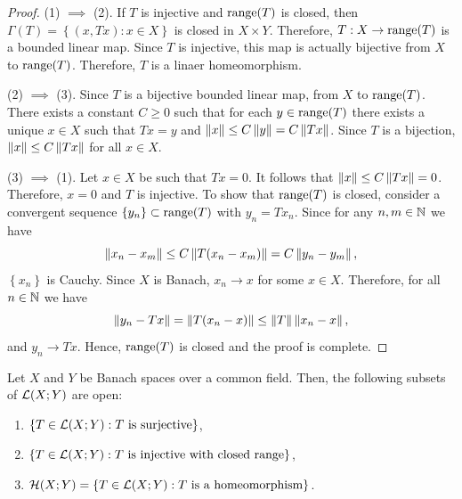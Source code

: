\documentclass[a4paper]{article}
\begin{document}
\begin{proof}
  (1) $\implies$ (2). If $T$ is injective and $\operatorname{range}(T)$ is closed,
  then $\Gamma(T) = \left\{ (x, Tx) : x \in X \right\}$ is closed in
  $X \times Y$. Therefore, $T : X \to \operatorname{range} (T)$ is a bounded linear
  map. Since $T$ is injective, this map is actually bijective from
  $X$ to $\operatorname{range} (T)$. Therefore, $T$ is a linaer homeomorphism.

  (2) $\implies$ (3). Since $T$ is a bijective bounded linear map,
  from $X$ to $\operatorname{range}(T)$. There exists a constant $C \geq 0$
  such that for each $y \in \operatorname{range}(T)$ there exists
  a unique $x \in X$ such that $T x = y$ and $\left\lVert x\right\rVert \leq
  C \left\lVert y\right\rVert = C \left\lVert T x\right\rVert$. Since $T$ is a bijection,
  $\left\lVert x\right\rVert \leq C \left\lVert T x\right\rVert$ for all $x \in X$.

  (3) $\implies$ (1). Let $x \in X$ be such that $T x = 0$.
  It follows that $\left\lVert x\right\rVert \leq C \left\lVert T x\right\rVert = 0$. Therefore,
  $x = 0$ and $T$ is injective. To show that
  $\operatorname{range}(T)$ is closed, consider a convergent sequence
  $\left\{ y_n \right\} \subset \operatorname{range}(T)$ with
  $y_n = T x_n$. Since for any $n, m \in \mathbb{N}$ we have
  \[
  \left\lVert x_n - x_m\right\rVert \leq C \left\lVert T (x_n - x_m)\right\rVert = C \left\lVert y_n - y_m\right\rVert,
  \]
  $\left\{ x_n \right\}$ is Cauchy. Since $X$ is Banach,
  $x_n \to x$ for some $x \in X$. Therefore, for
  all $n \in \mathbb{N}$ we have
  \[
  \left\lVert y_n - T x\right\rVert = \left\lVert T (x_n - x)\right\rVert \leq \left\lVert T\right\rVert \left\lVert x_n - x\right\rVert,
  \]
  and $y_n \to T x$. Hence, $\operatorname{range}(T)$ is closed and the proof is
  complete.

\end{proof}

\begin{thm}
  Let $X$ and $Y$ be Banach spaces over a common field.
  Then, the following subsets of $\mathcal{L}(X; Y)$ are open:
  \begin{enumerate}
    \item $\left\{ T \in \mathcal{L}(X; Y) : \text{$T$ is surjective} \right\}$,
    \item $\left\{ T \in \mathcal{L}(X; Y) : \text{$T$ is injective with closed range} \right\}$,
    \item $\mathcal{H}(X; Y) = \left\{ T \in \mathcal{L}(X; Y) : \text{$T$ is a homeomorphism} \right\}$.
  \end{enumerate}
\end{thm}
\end{document}
